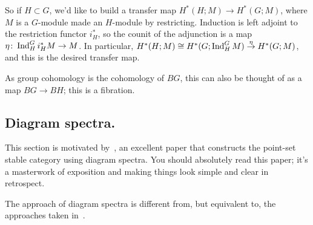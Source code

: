 So if $H\subset G$, we'd like to build a transfer map $H^*(H;M)\to H^*(G;M)$, where $M$ is a $G$-module made an
$H$-module by restricting. Induction is left adjoint to the restriction functor $i_H^*$, so the counit of the
adjunction is a map $\eta\colon\operatorname{Ind}_H^G i_H^*M\to M$. In particular, $H^*(H;M)\cong H^*(G;\operatorname{Ind}_H^G
M)\stackrel\eta\to H^*(G;M)$, and this is the desired transfer map.

As group cohomology is the cohomology of $BG$, this can also be thought of as a map $BG\to BH$; this is a
fibration.
\subsection*{Diagram spectra.}
This section is motivated by~\cite{MMSS}, an excellent paper that constructs the point-set stable category using
diagram spectra. You should absolutely read this paper; it's a masterwork of exposition and making things look
simple and clear in retrospect.

The approach of diagram spectra is different from, but equivalent to, the approaches taken
in~\cite{LMS,AlaskaNotes}.


